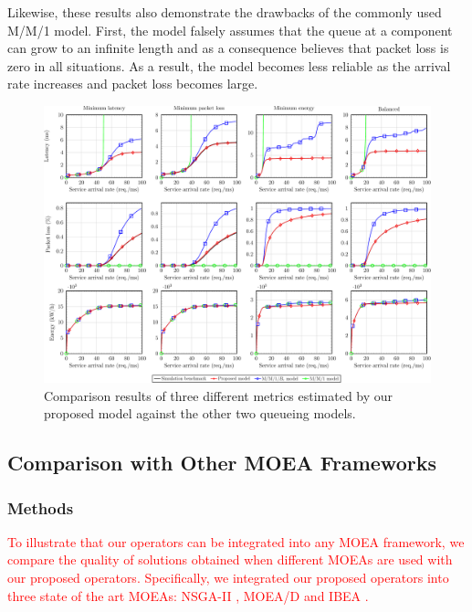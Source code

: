 Likewise, these results also demonstrate the drawbacks of the commonly used M/M/1 model. First, the model falsely assumes that the queue at a component can grow to an infinite length and as a consequence believes that packet loss is zero in all situations. As a result, the model becomes less reliable as the arrival rate increases and packet loss becomes large.

\vspace{0.5em}
\noindent
{}

\begin{figure}[t!]
    \centering
    \includegraphics[width=\textwidth]{graphs/general/model_sim-crop}
    \caption{Comparison results of three different metrics estimated by our proposed model against the other two queueing models.}
    \label{fig:model_sim}
\end{figure}

\subsection{Comparison with Other MOEA Frameworks}
\label{sec:moea_comparison}

\subsubsection{Methods}
\textcolor{red}{To illustrate that our operators can be integrated into any MOEA framework, we compare the quality of solutions obtained when different MOEAs are used with our proposed operators. Specifically, we integrated our proposed operators into three state of the art MOEAs: NSGA-II \cite{DebAPM02}, MOEA/D \cite{ZhangL07} and IBEA \cite{ZitzlerK04}.}

